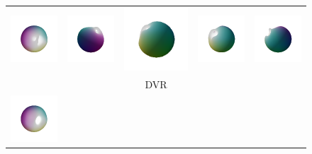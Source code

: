 \documentclass[runningheads]{llncs}
\begin{document}
\begin{figure}[t]
\centering
    \begin{tabular}{ccccc}
         \includegraphics[width=0.2\columnwidth]{color/dvr/eval_10000_4.png} &  
         \includegraphics[width=0.2\columnwidth]{color/dvr/eval_10000_1.png} &
         \includegraphics[width=0.2\columnwidth]{color/dvr/eval_10000_2.png} &
         \includegraphics[width=0.2\columnwidth]{color/dvr/eval_10000_3.png} &
         \includegraphics[width=0.2\columnwidth]{color/dvr/eval_10000_9.png} \vspace{-10pt} \\ 
         & & {DVR} & & \\
         \includegraphics[width=0.2\columnwidth]{color/udr_minus/eval_10000_3.png} &  

\end{tabular}
\end{figure}
\end{document}
